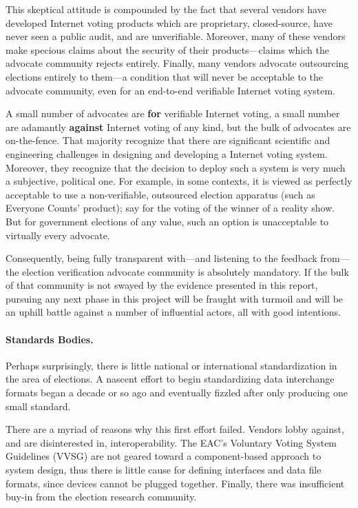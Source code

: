 This skeptical attitude is compounded by the fact that several vendors
have developed Internet voting products which are proprietary,
closed-source, have never seen a public audit, and are
unverifiable. Moreover, many of these vendors make specious claims
about the security of their products---claims which the advocate
community rejects entirely. Finally, many vendors advocate outsourcing
elections entirely to them---a condition that will never be acceptable
to the advocate community, even for an end-to-end verifiable Internet
voting system.

A small number of advocates are \textbf{for} verifiable Internet
voting, a small number are adamantly \textbf{against} Internet voting
of any kind, but the bulk of advocates are on-the-fence. That majority
recognize that there are significant scientific and engineering
challenges in designing and developing a Internet voting
system. Moreover, they recognize that the decision to deploy such a
system is very much a subjective, political one. For example, in some
contexts, it is viewed as perfectly acceptable to use a
non-verifiable, outsourced election apparatus (such as Everyone
Counts' product); say for the voting of the winner of a reality
show. But for government elections of any value, such an option is
unacceptable to virtually every advocate.

Consequently, being fully transparent with---and listening to the
feedback from---the election verification advocate community is
absolutely mandatory. If the bulk of that community is not swayed by
the evidence presented in this report, pursuing any next phase in this
project will be fraught with turmoil and will be an uphill battle
against a number of influential actors, all with good intentions.

\paragraph{Standards Bodies.} Perhaps surprisingly, there is little
national or international standardization in the area of elections.  A
nascent effort to begin standardizing data interchange formats began a
decade or so ago and eventually fizzled after only producing one
small standard.

There are a myriad of reasons why this first effort failed. Vendors
lobby against, and are disinterested in, interoperability. The EAC's
Voluntary Voting System Guidelines (VVSG) are not geared toward a
component-based approach to system design, thus there is little cause
for defining interfaces and data file formats, since devices cannot be
plugged together. Finally, there was insufficient buy-in from the
election research community.

